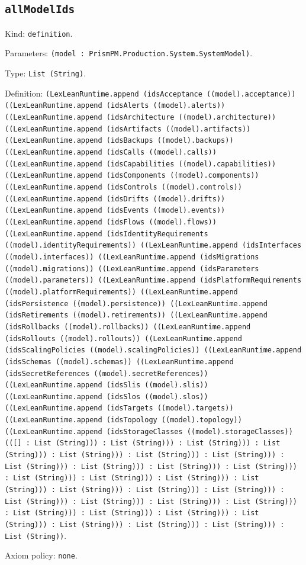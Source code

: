 \documentclass[11pt]{article}
\begin{document}
\subsection*{\texttt{allModelIds}}
\noindent Kind: \texttt{definition}.\par
\noindent Parameters: \texttt{(model : PrismPM.Production.System.SystemModel)}.\par
\noindent Type: \texttt{List (String)}.\par
\noindent Definition: \texttt{(LexLeanRuntime.append (idsAcceptance ((model).acceptance)) ((LexLeanRuntime.append (idsAlerts ((model).alerts)) ((LexLeanRuntime.append (idsArchitecture ((model).architecture)) ((LexLeanRuntime.append (idsArtifacts ((model).artifacts)) ((LexLeanRuntime.append (idsBackups ((model).backups)) ((LexLeanRuntime.append (idsCalls ((model).calls)) ((LexLeanRuntime.append (idsCapabilities ((model).capabilities)) ((LexLeanRuntime.append (idsComponents ((model).components)) ((LexLeanRuntime.append (idsControls ((model).controls)) ((LexLeanRuntime.append (idsDrifts ((model).drifts)) ((LexLeanRuntime.append (idsEvents ((model).events)) ((LexLeanRuntime.append (idsFlows ((model).flows)) ((LexLeanRuntime.append (idsIdentityRequirements ((model).identityRequirements)) ((LexLeanRuntime.append (idsInterfaces ((model).interfaces)) ((LexLeanRuntime.append (idsMigrations ((model).migrations)) ((LexLeanRuntime.append (idsParameters ((model).parameters)) ((LexLeanRuntime.append (idsPlatformRequirements ((model).platformRequirements)) ((LexLeanRuntime.append (idsPersistence ((model).persistence)) ((LexLeanRuntime.append (idsRetirements ((model).retirements)) ((LexLeanRuntime.append (idsRollbacks ((model).rollbacks)) ((LexLeanRuntime.append (idsRollouts ((model).rollouts)) ((LexLeanRuntime.append (idsScalingPolicies ((model).scalingPolicies)) ((LexLeanRuntime.append (idsSchemas ((model).schemas)) ((LexLeanRuntime.append (idsSecretReferences ((model).secretReferences)) ((LexLeanRuntime.append (idsSlis ((model).slis)) ((LexLeanRuntime.append (idsSlos ((model).slos)) ((LexLeanRuntime.append (idsTargets ((model).targets)) ((LexLeanRuntime.append (idsTopology ((model).topology)) ((LexLeanRuntime.append (idsStorageClasses ((model).storageClasses)) (([] : List (String))) : List (String))) : List (String))) : List (String))) : List (String))) : List (String))) : List (String))) : List (String))) : List (String))) : List (String))) : List (String))) : List (String))) : List (String))) : List (String))) : List (String))) : List (String))) : List (String))) : List (String))) : List (String))) : List (String))) : List (String))) : List (String))) : List (String))) : List (String))) : List (String))) : List (String))) : List (String))) : List (String))) : List (String))) : List (String))}.\par
\noindent Axiom policy: \texttt{none}.\par
\end{document}
